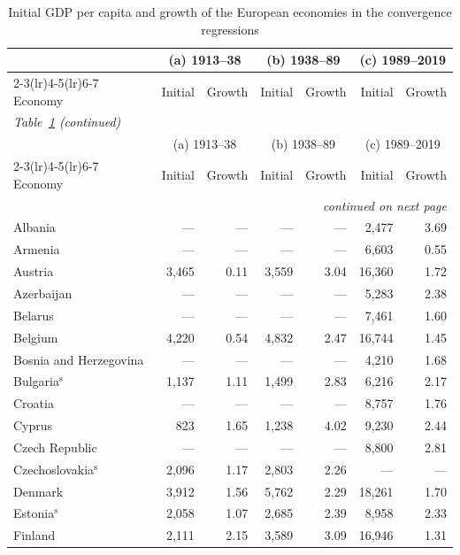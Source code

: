 \setlength{\tabcolsep}{4pt}
\begin{longtable}{lrrrrrr}
\caption{Initial GDP per capita and growth of the European economies in the convergence regressions}\label{tab:betadata}\\
\toprule
& \multicolumn{2}{c}{(a) 1913--38} & \multicolumn{2}{c}{(b) 1938--89} & \multicolumn{2}{c}{(c) 1989--2019} \\
\cmidrule(lr){2-3}\cmidrule(lr){4-5}\cmidrule(lr){6-7}
Economy & Initial & Growth & Initial & Growth & Initial & Growth \\
\midrule
\endfirsthead
\multicolumn{7}{l}{\textit{Table~\ref{tab:betadata} (continued)}} \\ \toprule
& \multicolumn{2}{c}{(a) 1913--38} & \multicolumn{2}{c}{(b) 1938--89} & \multicolumn{2}{c}{(c) 1989--2019} \\
\cmidrule(lr){2-3}\cmidrule(lr){4-5}\cmidrule(lr){6-7}
Economy & Initial & Growth & Initial & Growth & Initial & Growth \\
\midrule
\endhead
\midrule \multicolumn{7}{r}{\textit{continued on next page}} \\
\endfoot
\bottomrule
\endlastfoot
Albania & --- & --- & --- & --- & 2,477 & 3.69 \\
Armenia & --- & --- & --- & --- & 6,603 & 0.55 \\
Austria & 3,465 & 0.11 & 3,559 & 3.04 & 16,360 & 1.72 \\
Azerbaijan & --- & --- & --- & --- & 5,283 & 2.38 \\
Belarus & --- & --- & --- & --- & 7,461 & 1.60 \\
Belgium & 4,220 & 0.54 & 4,832 & 2.47 & 16,744 & 1.45 \\
Bosnia and Herzegovina & --- & --- & --- & --- & 4,210 & 1.68 \\
Bulgaria$^{\mathrm{s}}$ & 1,137 & 1.11 & 1,499 & 2.83 & 6,216 & 2.17 \\
Croatia & --- & --- & --- & --- & 8,757 & 1.76 \\
Cyprus & 823 & 1.65 & 1,238 & 4.02 & 9,230 & 2.44 \\
Czech Republic & --- & --- & --- & --- & 8,800 & 2.81 \\
Czechoslovakia$^{\mathrm{s}}$ & 2,096 & 1.17 & 2,803 & 2.26 & --- & --- \\
Denmark & 3,912 & 1.56 & 5,762 & 2.29 & 18,261 & 1.70 \\
Estonia$^{\mathrm{s}}$ & 2,058 & 1.07 & 2,685 & 2.39 & 8,958 & 2.33 \\
Finland & 2,111 & 2.15 & 3,589 & 3.09 & 16,946 & 1.31 \\

\end{longtable}
